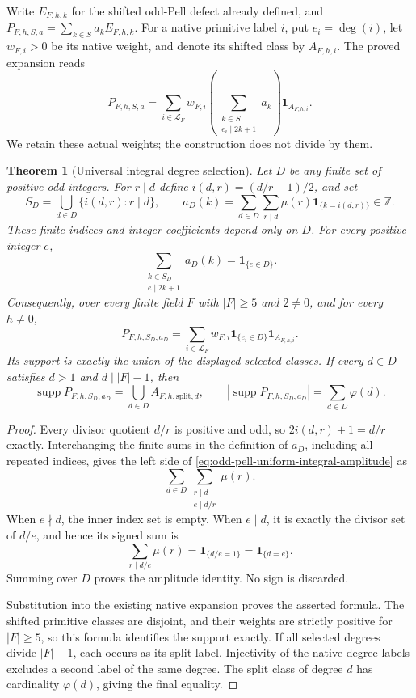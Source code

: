 \documentclass[11pt]{article}
\newtheorem{theorem}{Theorem}[section]
\begin{document}
Write \(E_{F,h,k}\) for the shifted odd-Pell defect already defined,
and \(P_{F,h,S,a}=\sum_{k\in S}a_kE_{F,h,k}\).
For a native primitive label \(i\), put \(e_i=\deg(i)\), let
\(w_{F,i}>0\) be its native weight, and denote its shifted class by
\(A_{F,h,i}\).  The proved expansion reads
\[
 P_{F,h,S,a}
 =\sum_{i\in\mathcal L_F}
 w_{F,i}\left(\sum_{\substack{k\in S\\e_i\mid2k+1}}a_k\right)
 \mathbf1_{A_{F,h,i}}.
\]
We retain these actual weights; the construction does not divide by them.

\begin{theorem}[Universal integral degree selection]
\label{thm:odd-pell-uniform-integral-selection}
Let \(D\) be any finite set of positive odd integers.  For \(r\mid d\)
define \(i(d,r)=(d/r-1)/2\), and set
\[
 S_D=\bigcup_{d\in D}\{i(d,r):r\mid d\},\qquad
 a_D(k)=\sum_{d\in D}\sum_{r\mid d}
       \mu(r)\mathbf1_{\{k=i(d,r)\}}\in\mathbb Z.
\]
These finite indices and integer coefficients depend only on \(D\).
For every positive integer \(e\),
\begin{equation}
 \sum_{\substack{k\in S_D\\e\mid2k+1}}a_D(k)
 =\mathbf1_{\{e\in D\}}.
 \label{eq:odd-pell-uniform-integral-amplitude}
\end{equation}
Consequently, over every finite field \(F\) with \(|F|\ge5\)
and \(2\ne0\), and for every \(h\ne0\),
\[
 P_{F,h,S_D,a_D}
 =\sum_{i\in\mathcal L_F}
     w_{F,i}\mathbf1_{\{e_i\in D\}}\mathbf1_{A_{F,h,i}}.
\]
Its support is exactly the union of the displayed selected classes.
If every \(d\in D\) satisfies \(d>1\) and \(d\mid |F|-1\), then
\[
 \operatorname{supp}P_{F,h,S_D,a_D}
   =\bigcup_{d\in D}A_{F,h,\mathrm{split},d},
 \qquad
 |\operatorname{supp}P_{F,h,S_D,a_D}|=\sum_{d\in D}\varphi(d).
\]
\end{theorem}
\begin{proof}
Every divisor quotient \(d/r\) is positive and odd, so
\(2i(d,r)+1=d/r\) exactly.  Interchanging the finite sums in the
definition of \(a_D\), including all repeated indices, gives the left
side of \eqref{eq:odd-pell-uniform-integral-amplitude} as
\[
 \sum_{d\in D}
   \sum_{\substack{r\mid d\\e\mid d/r}}\mu(r).
\]
When \(e\nmid d\), the inner index set is empty.  When \(e\mid d\),
it is exactly the divisor set of \(d/e\), and hence its signed sum is
\[
 \sum_{r\mid d/e}\mu(r)=\mathbf1_{\{d/e=1\}}
                      =\mathbf1_{\{d=e\}}.
\]
Summing over \(D\) proves the amplitude identity.  No sign is discarded.

Substitution into the existing native expansion proves the asserted
formula.  The shifted primitive classes are disjoint, and their weights
are strictly positive for \(|F|\ge5\), so this formula identifies the
support exactly.  If all selected degrees divide \(|F|-1\), each occurs
as its split label.  Injectivity of the native degree labels excludes a
second label of the same degree.  The split class of degree \(d\) has
cardinality \(\varphi(d)\), giving the final equality.
\end{proof}
\end{document}
